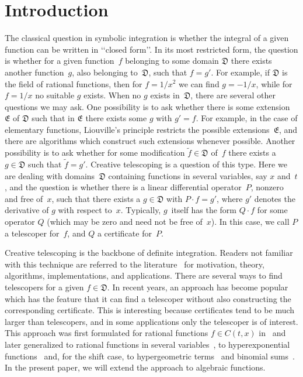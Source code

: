 \documentclass{sig-alternate}
\begin{document}


\section{Introduction}\label{SECT:intro}

The classical question in symbolic integration is whether the integral of
a given function can be written in \lq\lq closed form\rq\rq. In its most restricted form,
the question is whether for a given function~$f$ belonging to some domain $\mathfrak{D}$
there exists another function~$g$, also belonging to~$\mathfrak{D}$, such that $f=g'$. For
example, if $\mathfrak{D}$ is the field of rational functions, then for $f=1/x^2$ we can
find $g=-1/x$, while for $f=1/x$ no suitable $g$ exists. When no $g$ exists
in~$\mathfrak{D}$, there are several other questions we may ask. One possibility is to ask
whether there is some extension~$\mathfrak{E}$ of $\mathfrak{D}$ such that in $\mathfrak{E}$ there exists some
$g$ with $g'=f$. For example, in the case of elementary functions, Liouville's
principle restricts the possible extensions~$\mathfrak{E}$, and there are algorithms which
construct such extensions whenever possible. Another possibility is
to ask whether for some modification $\tilde f\in \mathfrak{D}$ of~$f$ there exists a $g\in
\mathfrak{D}$ such that $\tilde f=g'$. Creative telescoping is a question of this
type. Here we are dealing with domains~$\mathfrak{D}$ containing functions in several
variables, say $x$ and~$t$, and the question is whether there is a linear
differential operator~$P$, nonzero and free of~$x$, such that there exists a
$g\in \mathfrak{D}$ with $P\cdot f=g'$, where $g'$ denotes the derivative of $g$ with
respect to~$x$. Typically, $g$~itself has the form $Q\cdot f$ for some operator
$Q$ (which may be zero and need not be free of~$x$). In this case, we call $P$
a telescoper for~$f$, and $Q$ a certificate for~$P$.

Creative telescoping is the backbone of definite integration. Readers not
familiar with this technique are referred to the literature~\cite{PWZbook1996,Zeilberger1990c,Zeilberger1991,Zeilberger1990,Koepf1998}
for motivation, theory, algorithms, implementations, and applications. There are
several ways to find telescopers for a given $f\in \mathfrak{D}$. In recent years, an
approach has become popular which has the feature that it can find a telescoper
without also constructing the corresponding certificate. This is interesting
because certificates tend to be much larger than telescopers, and in some
applications only the telescoper is of interest. This approach was first
formulated for rational functions $f\in C(t,x)$ in~\cite{BCCL2010} and later
generalized to rational functions in several variables~\cite{bostan13, lairez15}, to
hyperexponential functions~\cite{bostan13a} and, for the shift case, to hypergeometric
terms~\cite{chen15a} and binomial sums~\cite{bostan15}. In the present paper, we will extend
the approach to algebraic functions.
\end{document}
